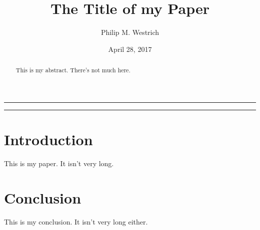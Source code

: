 \documentclass[10pt]{article}
\title{The Title of my Paper}
\author{Philip M. Westrich}
\date{April 28, 2017}
\begin{document}
\maketitle
\vspace{-0.3in}\noindent\rule{\linewidth}{0.4pt}
\doublespacing

\begin{abstract}

    This is my abstract. There's not much here.
 
\end{abstract}

\vspace{-0.3in}\noindent\rule{\linewidth}{0.4pt}

\section{Introduction}

This is my paper. It isn't very long.

\section{Conclusion}

This is my conclusion. It isn't very long either.
\end{document}
